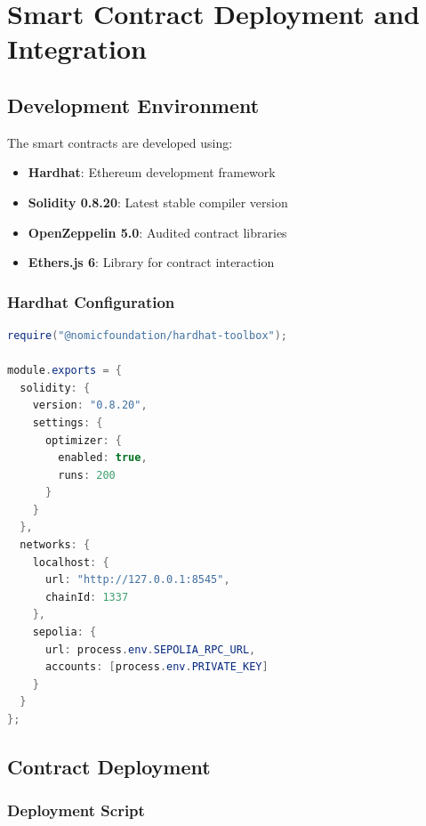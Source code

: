 \documentclass[12pt]{report}
\theoremstyle{plain}
\theoremstyle{definition}
\theoremstyle{remark}
\begin{document}
\chapter{Smart Contract Deployment and Integration}

\section{Development Environment}

The smart contracts are developed using:

\begin{itemize}
    \item \textbf{Hardhat}: Ethereum development framework
    \item \textbf{Solidity 0.8.20}: Latest stable compiler version
    \item \textbf{OpenZeppelin 5.0}: Audited contract libraries
    \item \textbf{Ethers.js 6}: Library for contract interaction
\end{itemize}

\subsection{Hardhat Configuration}

\begin{lstlisting}[language=Java, caption=hardhat.config.js]
require("@nomicfoundation/hardhat-toolbox");

module.exports = {
  solidity: {
    version: "0.8.20",
    settings: {
      optimizer: {
        enabled: true,
        runs: 200
      }
    }
  },
  networks: {
    localhost: {
      url: "http://127.0.0.1:8545",
      chainId: 1337
    },
    sepolia: {
      url: process.env.SEPOLIA_RPC_URL,
      accounts: [process.env.PRIVATE_KEY]
    }
  }
};
\end{lstlisting}

\section{Contract Deployment}

\subsection{Deployment Script}
\end{document}
